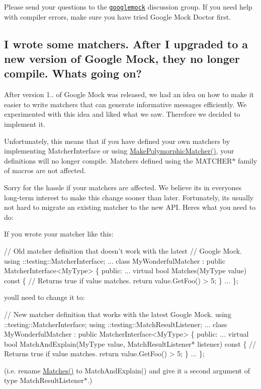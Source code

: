 Please send your questions to the \href{http://groups.google.com/group/googlemock}{\tt googlemock} discussion group. If you need help with compiler errors, make sure you have tried Google Mock Doctor first.

\subsection*{I wrote some matchers. After I upgraded to a new version of Google Mock, they no longer compile. What\textquotesingle{}s going on?}

After version 1.. of Google Mock was released, we had an idea on how to make it easier to write matchers that can generate informative messages efficiently. We experimented with this idea and liked what we saw. Therefore we decided to implement it.

Unfortunately, this means that if you have defined your own matchers by implementing {\ttfamily Matcher\+Interface} or using {\ttfamily \hyperlink{namespacetesting_a667ca94f190ec2e17ee2fbfdb7d3da04}{Make\+Polymorphic\+Matcher()}}, your definitions will no longer compile. Matchers defined using the {\ttfamily M\+A\+T\+C\+H\+E\+R$\ast$} family of macros are not affected.

Sorry for the hassle if your matchers are affected. We believe it\textquotesingle{}s in everyone\textquotesingle{}s long-\/term interest to make this change sooner than later. Fortunately, it\textquotesingle{}s usually not hard to migrate an existing matcher to the new A\+PI. Here\textquotesingle{}s what you need to do\+:

If you wrote your matcher like this\+: 
\begin{DoxyCode}
// Old matcher definition that doesn't work with the latest
// Google Mock.
using ::testing::MatcherInterface;
...
class MyWonderfulMatcher : public MatcherInterface<MyType> \{
 public:
  ...
  virtual bool Matches(MyType value) const \{
    // Returns true if value matches.
    return value.GetFoo() > 5;
  \}
  ...
\};
\end{DoxyCode}


you\textquotesingle{}ll need to change it to\+: 
\begin{DoxyCode}
// New matcher definition that works with the latest Google Mock.
using ::testing::MatcherInterface;
using ::testing::MatchResultListener;
...
class MyWonderfulMatcher : public MatcherInterface<MyType> \{
 public:
  ...
  virtual bool MatchAndExplain(MyType value,
                               MatchResultListener* listener) const \{
    // Returns true if value matches.
    return value.GetFoo() > 5;
  \}
  ...
\};
\end{DoxyCode}
 (i.\+e. rename {\ttfamily \hyperlink{namespacetesting_ad53b509ae9cd51040d67f668f99702ae}{Matches()}} to {\ttfamily Match\+And\+Explain()} and give it a second argument of type {\ttfamily Match\+Result\+Listener$\ast$}.)

